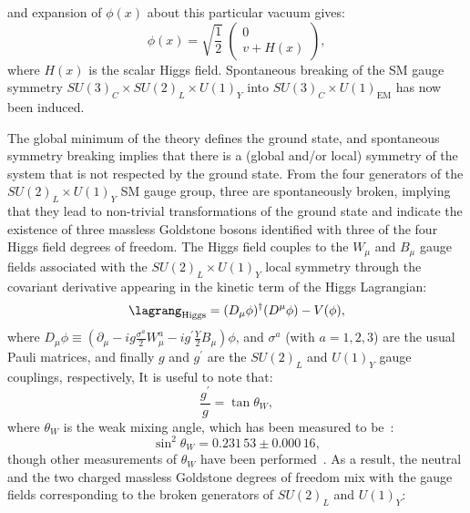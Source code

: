 and expansion of $\phi(x)$ about this particular vacuum gives:
\begin{equation*}
    \phi(x) = 
    \sqrt{ \frac{1}{2} }
    \hspace{3pt}
    \begin{pmatrix}
        0
        \\
        v + H(x)
    \end{pmatrix},
\end{equation*}
where $H(x)$ is the scalar Higgs field.
Spontaneous breaking of the SM gauge symmetry $SU(3)_C \times SU(2)_L \times U(1)_Y$ into $SU(3)_C \times U(1)_\text{EM}$ has now been induced.

The global minimum of the theory defines the ground state, and spontaneous symmetry breaking implies that there is a (global and/or local) symmetry of the system that is not respected by the ground state.
From the four generators of the $SU(2)_L \times U(1)_Y$ SM gauge group, three are spontaneously broken, implying that they lead to non-trivial transformations of the ground state and indicate the existence of three massless Goldstone bosons identified with three of the four Higgs field degrees of freedom.
The Higgs field couples to the $W_\mu$ and $B_\mu$ gauge fields associated with the $SU(2)_L \times U(1)_Y$ local symmetry through the covariant derivative appearing in the kinetic term of the Higgs Lagrangian:
\begin{equation*}
    \lagrang_\text{Higgs} = (D_\mu\phi)^\dagger(D^\mu\phi) - V(\phi),
\end{equation*}
where $D_\mu\phi \equiv \left( \partial_\mu - ig \frac{\sigma^a}{2}W^a_\mu - ig^\prime \frac{Y}{2} B_\mu \right)\phi$,
and $\sigma^a$ (with $a = 1,2,3$) are the usual Pauli matrices,
and finally $g$ and $g^\prime$ are the $SU(2)_L$ and $U(1)_Y$ gauge couplings, respectively,
It is useful to note that:
\begin{equation*}
    \frac{g^\prime}{g} = \tan{\theta_W},
\end{equation*}
where $\theta_W$ is the weak mixing angle, which has been measured to be~\cite{noauthor_precision_2006}:
\begin{equation*}
    \sin^2{\theta_W} = 0.231\,53 \pm 0.000\,16,
\end{equation*}
though other measurements of $\theta_W$ have been performed~\cite{the_lhcb_collaboration_measurement_2015, cms_collaboration_measurement_2018}.
As a result, the neutral and the two charged massless Goldstone degrees of freedom mix with the gauge fields corresponding to the broken generators of $SU(2)_L$ and $U(1)_Y$:
